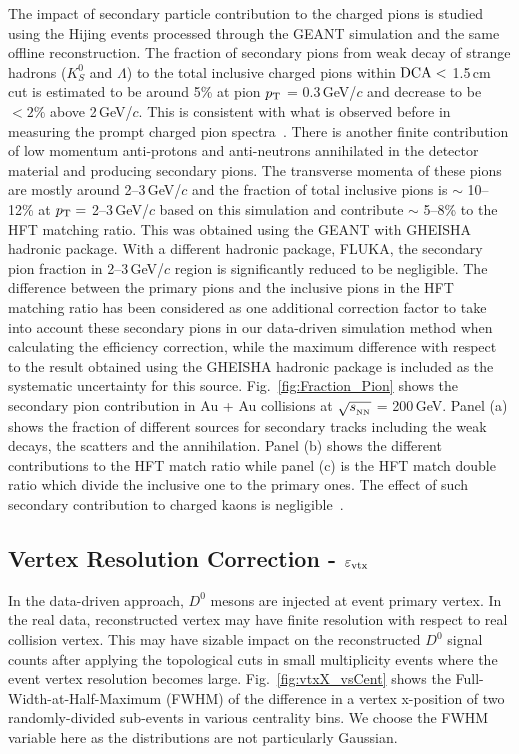 \documentclass[%
 reprint,	
 amsmath,amssymb,
 aps,
 prc,
]{revtex4-1}
\begin{document}
The impact of secondary particle contribution to the charged pions is studied using the Hijing events processed through the GEANT simulation and the same offline reconstruction. The fraction of secondary pions from weak decay of strange hadrons ($K^0_S$ and $\Lambda$) to the total inclusive charged pions within ${\rm DCA}<$ 1.5\,cm cut is estimated to be around 5\% at pion $p_{\rm T}$ = 0.3\,GeV/$c$ and decrease to be $<2\%$ above 2\,GeV/$c$. This is consistent with what is observed before in measuring the prompt charged pion spectra~\cite{Adams:2003xp}. There is another finite contribution of low momentum anti-protons and anti-neutrons annihilated in the detector material and producing secondary pions. The transverse momenta of these pions are mostly around 2--3\,GeV/$c$ and the fraction of total inclusive pions is $\sim$ 10--12\% at $p_{\rm T}=$ 2--3\,GeV/$c$ based on this simulation and contribute $\sim$ 5--8\% to the HFT matching ratio. This was obtained using the GEANT with GHEISHA hadronic package. With a different hadronic package, FLUKA, the secondary pion fraction in 2--3\,GeV/$c$ region is significantly reduced to be negligible. The difference between the primary pions and the inclusive pions in the HFT matching ratio has been considered as one additional correction factor to take into account these secondary pions in our data-driven simulation method when calculating the efficiency correction, while the maximum difference with respect to the result obtained using the GHEISHA hadronic package is included as the systematic uncertainty for this source.  Fig.~\ref{fig:Fraction_Pion} shows the secondary pion contribution in Au + Au collisions at $\sqrt{s_{_{\rm NN}}}$ = 200\,GeV. Panel (a) shows the fraction of different sources for secondary tracks including the weak decays, the scatters and the annihilation. Panel (b) shows the different contributions to the HFT match ratio while panel (c) is the HFT match double ratio which divide the inclusive one to the primary ones. The effect of such secondary contribution to charged kaons is negligible~\cite{Adams:2003xp}.

\subsection{\label{sec:correction:vtx}Vertex Resolution Correction - $\varepsilon_{\rm vtx}$}

In the data-driven approach, $D^0$ mesons are injected at event primary vertex. In the real data, reconstructed vertex may have finite resolution with respect to real collision vertex. This may have sizable impact on the reconstructed $D^0$ signal counts after applying the topological cuts in small multiplicity events where the event vertex resolution becomes large. Fig.~\ref{fig:vtxX_vsCent} shows the Full-Width-at-Half-Maximum (FWHM) of the difference in a vertex x-position of two randomly-divided sub-events in various centrality bins. We choose the FWHM variable here as the distributions are not particularly Gaussian.
\end{document}
